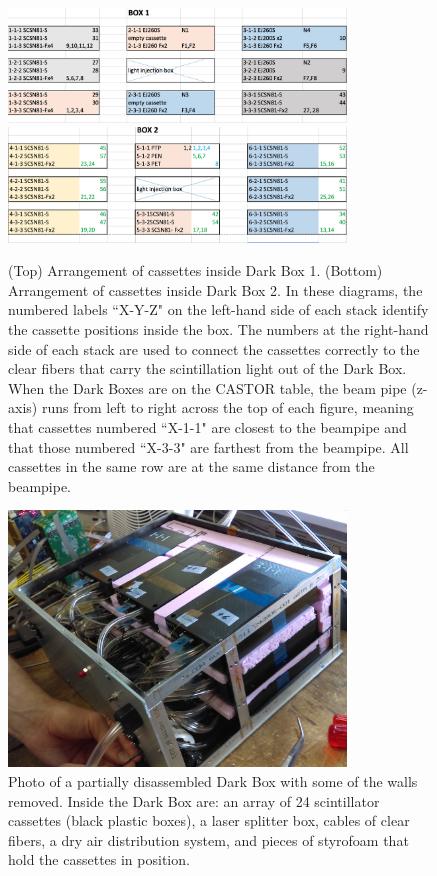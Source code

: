 \begin{figure}[hbtp]
\begin{center}
\includegraphics[width=0.8\textwidth]{figures/Box1_SamplesMap}
\includegraphics[width=0.8\textwidth]{figures/Box2_SamplesMap}
\caption{(Top) Arrangement of cassettes inside Dark Box 1. (Bottom) Arrangement of cassettes inside Dark Box 2. In these diagrams, the numbered labels ``X-Y-Z" on the left-hand side of each stack identify the cassette positions inside the box. The numbers at the right-hand side of each stack are used to connect the cassettes correctly to the clear fibers that carry the scintillation light out of the Dark Box. When the Dark Boxes are on the CASTOR table, the beam pipe (z-axis) runs from left to right across the top of each figure, meaning that cassettes numbered ``X-1-1" are closest to the beampipe and that those numbered ``X-3-3" are farthest from the beampipe. All cassettes in the same row are at the same distance from the beampipe.}
\label{fig:box-schematic}
\end{center}
\end{figure}

\begin{figure}[hbtp]
\begin{center}
\includegraphics[width=0.8\textwidth]{figures/dark-box-1}
\caption{Photo of a partially disassembled Dark Box with some of the walls removed. Inside the Dark Box are: an array of 24 scintillator cassettes (black plastic boxes), a laser splitter box, cables of clear fibers, a dry air distribution system, and pieces of styrofoam that hold the cassettes in position.}
\label{fig:dark-box-1}
\end{center}
\end{figure}

